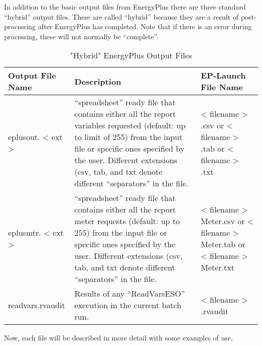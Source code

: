 In addition to the basic output files from EnergyPlus there are three standard ``hybrid'' output files. These are called ``hybrid'' because they are a result of post-processing after EnergyPlus has completed. Note that if there is an error during processing, these will not normally be ``complete''.

\begin{longtable}[c]{p{1.5in}p{3.0in}p{1.5in}}
\caption{"Hybrid" EnergyPlus Output Files \protect \label{table:hybrid-energyplus-output-files}}\\
\toprule 
Output File Name & Description & EP-Launch File Name \tabularnewline \midrule
\endhead
eplusout. < ext >  ~ & “spreadsheet” ready file that contains either all the report variables requested (default: up to limit of 255) from the input file or specific ones specified by the user. Different extensions (csv, tab, and txt denote different “separators” in the file. & < filename > .csv or  < filename > .tab or  < filename > .txt \tabularnewline
eplusmtr. < ext >  ~ & “spreadsheet” ready file that contains either all the report meter requests (default: up to 255) from the input file or specific ones specified by the user. Different extensions (csv, tab, and txt denote different “separators” in the file. & < filename > Meter.csv or  < filename > Meter.tab or  < filename > Meter.txt \tabularnewline
readvars.rvaudit & Results of any “ReadVarsESO” execution in the current batch run. & < filename > .rvaudit \tabularnewline
\bottomrule
\end{longtable}

Now, each file will be described in more detail with some examples of use.
